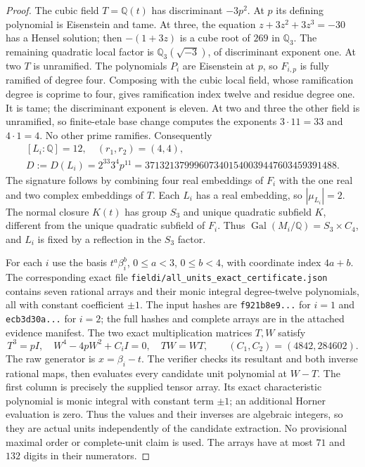 \begin{proof}
The cubic field $T=\mathbb Q(t)$ has discriminant $-3p^2$.
At $p$ its defining polynomial is Eisenstein and tame.
At three, the equation $z+3z^2+3z^3=-30$ has a Hensel solution;
then $-(1+3z)$ is a cube root of $269$ in $\mathbb Q_3$.
The remaining quadratic local factor is $\mathbb Q_3(\sqrt{-3})$,
of discriminant exponent one.  At two $T$ is unramified.
The polynomials $P_i$ are Eisenstein at $p$, so $F_{i,p}$ is
fully ramified of degree four.  Composing with the cubic local
field, whose ramification degree is coprime to four, gives
ramification index twelve and residue degree one.  It is tame;
the discriminant exponent is eleven.  At two and three the other
field is unramified, so finite-etale base change computes the
exponents $3\cdot11=33$ and $4\cdot1=4$.
No other prime ramifies.  Consequently
\[
 \begin{gathered}
 [L_i:\mathbb Q]=12,\quad(r_1,r_2)=(4,4),\\
 D:=D(L_i)=2^{33}3^4p^{11}
 =371321379996073401540039447603459391488.
 \end{gathered}
 \tag{G147C.9}
\]
The signature follows by combining four real embeddings of $F_i$
with the one real and two complex embeddings of $T$.
Each $L_i$ has a real embedding, so $|\mu_{L_i}|=2$.
The normal closure $K(t)$ has group $S_3$ and unique quadratic
subfield $K$, different from the unique quadratic subfield of $F_i$.
Thus $\operatorname{Gal}(M_i/\mathbb Q)=S_3\times C_4$,
and $L_i$ is fixed by a reflection in the $S_3$ factor.

For each $i$ use the basis $t^a\beta_i^b$, $0\le a<3$, $0\le b<4$,
with coordinate index $4a+b$.  The corresponding exact file
\texttt{fieldi/all\_units\_exact\_certificate.json} contains seven
rational arrays and their monic integral degree-twelve polynomials,
all with constant coefficient $\pm1$.
The input hashes are
\texttt{f921b8e9...} for $i=1$ and \texttt{ecb3d30a...} for $i=2$;
the full hashes and complete arrays are in the attached evidence manifest.
The two exact multiplication matrices $T,W$ satisfy
\[
 T^3=pI,\quad W^4-4pW^2+C_iI=0,\quad TW=WT,
 \qquad (C_1,C_2)=(4842,284602).
 \tag{G147C.10}
\]
The raw generator is $x=\beta_i-t$.
The verifier checks its resultant and both inverse rational maps,
then evaluates every candidate unit polynomial at $W-T$.
The first column is precisely the supplied tensor array.
Its exact characteristic polynomial is monic integral with
constant term $\pm1$; an additional Horner evaluation is zero.
Thus the values and their inverses are algebraic integers,
so they are actual units independently of the candidate extraction.
No provisional maximal order or complete-unit claim is used.
The arrays have at most $71$ and $132$ digits in their numerators.


\end{proof}
